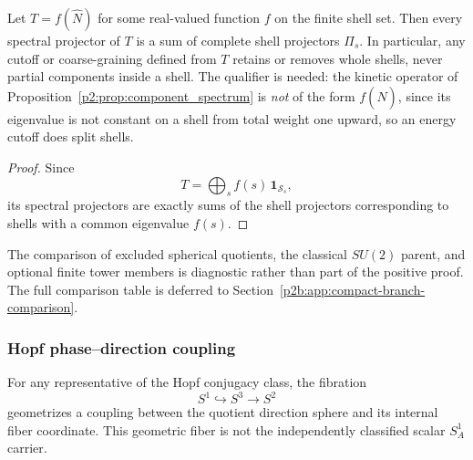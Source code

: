 \documentclass[11pt,a4paper]{article}
\begin{document}
\begin{proposition}
\label{p2:prop:shellwise-spectral-cutoff}
Let \(T=f(\hat N)\) for some real-valued function \(f\) on the finite shell set. Then every spectral projector of \(T\) is a sum of complete shell projectors \(\Pi_s\). In particular, any cutoff or coarse-graining defined from \(T\) retains or removes whole shells, never partial components inside a shell.  The qualifier is needed: the kinetic operator of Proposition~\ref{p2:prop:component_spectrum} is \emph{not} of the form \(f(\hat N)\), since its eigenvalue is not constant on a shell from total weight one upward, so an energy cutoff does split shells.
\end{proposition}

\begin{proof}
Since
\[
T=\bigoplus_s f(s)\,\mathbf 1_{\mathcal S_s},
\]
its spectral projectors are exactly sums of the shell projectors corresponding to shells with a common eigenvalue \(f(s)\).
\end{proof}


\begin{remark}
The comparison of excluded spherical quotients, the classical \(SU(2)\)
parent, and optional finite tower members is diagnostic rather than part of
the positive proof.  The full comparison table is deferred to
Section~\ref{p2b:app:compact-branch-comparison}.
\end{remark}

\subsubsection{Hopf phase--direction coupling}

For any representative of the Hopf conjugacy class, the fibration
\[
S^1\hookrightarrow S^3\to S^2
\]
geometrizes a coupling between the quotient direction sphere and its internal
fiber coordinate.  This geometric fiber is not the independently classified
scalar \(S^1_A\) carrier.
\end{document}
